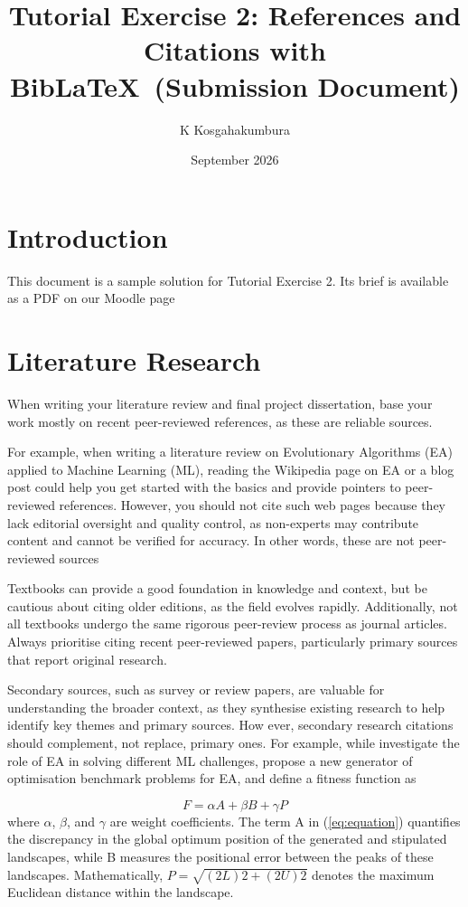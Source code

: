 \documentclass[a4paper, twocolumn]{article}
\title{Tutorial Exercise 2: References and Citations with \\  Bib\LaTeX\ (Submission Document)}
\author{K Kosgahakumbura}
\date{September 2026}
\begin{document}
\maketitle

\section{Introduction}
This document is a sample solution for Tutorial Exercise 2. Its brief is available as a PDF on our Moodle page

\section{Literature Research}

When writing your literature review and final
project dissertation, base your work mostly on recent peer-reviewed references, as these are reliable
sources.

For example, when writing a literature review
on Evolutionary Algorithms (EA) applied to Machine Learning (ML), reading the Wikipedia page
on EA \cite{wikipedia} or a blog post \cite{adan}
could help you get
started with the basics and provide pointers to
peer-reviewed references. However, you should not
cite such web pages because they lack editorial
oversight and quality control, as non-experts may
contribute content and cannot be verified for accuracy. In other words, these are not peer-reviewed
sources

Textbooks \cite{de2016evolutionary} can provide a good foundation in
knowledge and context, but be cautious about citing older editions, as the field evolves rapidly. Additionally, not all textbooks undergo the same rigorous peer-review process as journal articles. Always
prioritise citing recent peer-reviewed papers,
particularly primary sources that report original research.

Secondary sources, such as survey \cite{akbar} or review
papers, are valuable for understanding the broader
context, as they synthesise existing research to help
identify key themes and primary sources. How
ever, secondary research citations should complement,
not replace, primary ones. For example,
while \textcite{akbar} investigate the role of EA in
solving different ML challenges, \textcite{zhang}
propose a new generator of optimisation benchmark
problems for EA, and define a fitness function as

\begin{equation}
  F = \alpha A +\beta B + \gamma P
    \label{eq:equation}
\end{equation}
where $\alpha$,  $\beta$, and $\gamma$  are
weight coefficients. The term
A in (\ref{eq:equation}) quantifies the discrepancy in the global
optimum position of the generated and stipulated
landscapes, while B measures the positional error
between the peaks of these landscapes. Mathematically,
$P = \sqrt{ (2L)2 + (2U )2}$
denotes the maximum Euclidean distance within the landscape.
\end{document}

